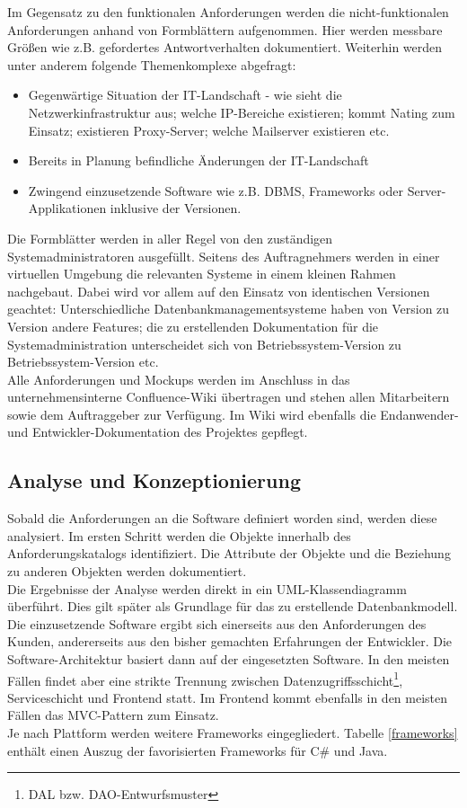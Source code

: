 \documentclass[a4paper,12pt]{scrreprt}
\begin{document}
Im Gegensatz zu den funktionalen Anforderungen werden die nicht-funktionalen Anforderungen anhand von Formblättern aufgenommen. Hier werden messbare Größen wie z.B. gefordertes Antwortverhalten dokumentiert. Weiterhin werden unter anderem folgende Themenkomplexe abgefragt:
\begin{itemize}
	\item Gegenwärtige Situation der IT-Landschaft - wie sieht die Netzwerkinfrastruktur aus; welche IP-Bereiche existieren; kommt Nating zum Einsatz; existieren Proxy-Server; welche Mailserver existieren etc.
	\item Bereits in Planung befindliche Änderungen	der IT-Landschaft
	\item Zwingend einzusetzende Software wie z.B. DBMS, Frameworks oder Server-Applikationen inklusive der Versionen.
\end{itemize}
Die Formblätter werden in aller Regel von den zuständigen Systemadministratoren ausgefüllt.
Seitens des Auftragnehmers werden in einer virtuellen Umgebung die relevanten Systeme in einem kleinen Rahmen nachgebaut. Dabei wird vor allem auf den Einsatz von identischen Versionen geachtet: Unterschiedliche Datenbankmanagementsysteme haben von Version zu Version andere Features; die zu erstellenden Dokumentation für die Systemadministration unterscheidet sich von Betriebssystem-Version zu Betriebssystem-Version etc.
\\
Alle Anforderungen und Mockups werden im Anschluss in das unternehmensinterne Confluence-Wiki übertragen und stehen allen Mitarbeitern sowie dem Auftraggeber zur Verfügung.
Im Wiki wird ebenfalls die Endanwender- und Entwickler-Dokumentation des Projektes gepflegt.
\subsection{Analyse und Konzeptionierung}
Sobald die Anforderungen an die Software definiert worden sind, werden diese analysiert. 
Im ersten Schritt werden die Objekte innerhalb des Anforderungskatalogs identifiziert. Die Attribute der Objekte und die Beziehung zu anderen Objekten werden dokumentiert.\\
Die Ergebnisse der Analyse werden direkt in ein UML-Klassendiagramm überführt. Dies gilt später als Grundlage für das zu erstellende Datenbankmodell.
\\
Die einzusetzende Software ergibt sich einerseits aus den Anforderungen des Kunden, andererseits aus den bisher gemachten Erfahrungen der Entwickler. Die Software-Architektur basiert dann auf der eingesetzten Software. In den meisten Fällen findet aber eine strikte Trennung zwischen Datenzugriffsschicht\footnote{DAL bzw. DAO-Entwurfsmuster}, Serviceschicht und Frontend statt. Im Frontend kommt ebenfalls in den meisten Fällen das MVC-Pattern zum Einsatz.\\
Je nach Plattform werden weitere Frameworks eingegliedert. Tabelle \ref{frameworks} enthält einen Auszug der favorisierten Frameworks für C\# und Java.
\end{document}

